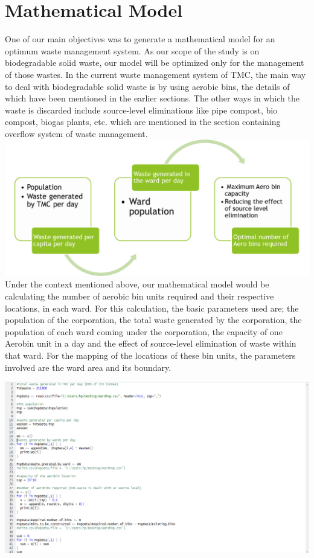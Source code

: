 \documentclass[12pt,a4paper]{  report}
\begin{document}
\chapter{\textbf{Mathematical Model}}
One of our main objectives was to generate a mathematical model for an optimum waste management system. As our scope of the study is on biodegradable solid waste, our model will be optimized only for the management of those wastes. In the current waste management system of TMC, the main way to deal with biodegradable solid waste is by using aerobic bins, the details of which have been mentioned in the earlier sections. The other ways in which the waste is discarded include source-level eliminations like pipe compost, bio compost, biogas plants, etc. which are mentioned in the section containing overflow system of waste management.
\includegraphics[width=1\textwidth]{mathmod}
Under the context mentioned above, our mathematical model would be calculating the number of aerobic bin units required and their respective locations, in each ward. For this calculation, the basic parameters used are; the population of the corporation, the total waste generated by the corporation, the population of each ward coming under the corporation, the capacity of one Aerobin unit in a day and the effect of source-level elimination of waste within that ward. For the mapping of the locations of these bin units, the parameters involved are the ward area and its boundary.

\includegraphics[width=1\textwidth]{mathmodr}
\end{document}
